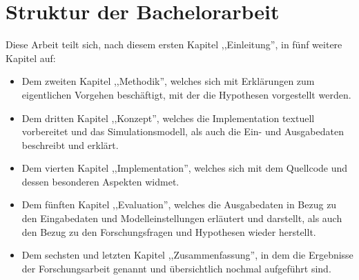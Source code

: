 %
%
\section{Struktur der Bachelorarbeit}\label{sec:struktur-der-bachelorarbeit}

Diese Arbeit teilt sich, nach diesem ersten Kapitel ,,Einleitung'', in fünf weitere Kapitel auf:

\begin{itemize}

    \item Dem zweiten Kapitel ,,Methodik'', welches sich mit Erklärungen zum eigentlichen Vorgehen beschäftigt, mit der die Hypothesen vorgestellt werden.
    \item Dem dritten Kapitel ,,Konzept'', welches die Implementation textuell vorbereitet und das Simulationsmodell, als auch die Ein- und Ausgabedaten beschreibt und erklärt.
    \item Dem vierten Kapitel ,,Implementation'', welches sich mit dem Quellcode und dessen besonderen Aspekten widmet.
    \item Dem fünften Kapitel ,,Evaluation'', welches die Ausgabedaten in Bezug zu den Eingabedaten und Modelleinstellungen erläutert und darstellt, als auch den Bezug zu den Forschungsfragen und Hypothesen wieder herstellt.
    \item Dem sechsten und letzten Kapitel ,,Zusammenfassung'', in dem die Ergebnisse der Forschungsarbeit genannt und übersichtlich nochmal aufgeführt sind.

\end{itemize}
